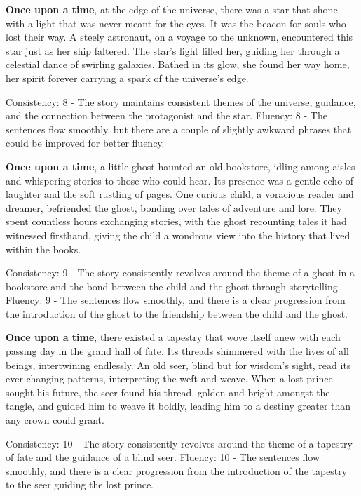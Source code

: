 \documentclass{article}
\begin{document}
\textbf{Once upon a time}, at the edge of the universe, there was a star that shone with a light that was never meant for the eyes. It was the beacon for souls who lost their way. A steely astronaut, on a voyage to the unknown, encountered this star just as her ship faltered. The star's light filled her, guiding her through a celestial dance of swirling galaxies. Bathed in its glow, she found her way home, her spirit forever carrying a spark of the universe's edge.

Consistency: 8 - The story maintains consistent themes of the universe, guidance, and the connection between the protagonist and the star.
Fluency: 8 - The sentences flow smoothly, but there are a couple of slightly awkward phrases that could be improved for better fluency.

\textbf{Once upon a time}, a little ghost haunted an old bookstore, idling among aisles and whispering stories to those who could hear. Its presence was a gentle echo of laughter and the soft rustling of pages. One curious child, a voracious reader and dreamer, befriended the ghost, bonding over tales of adventure and lore. They spent countless hours exchanging stories, with the ghost recounting tales it had witnessed firsthand, giving the child a wondrous view into the history that lived within the books.

Consistency: 9 - The story consistently revolves around the theme of a ghost in a bookstore and the bond between the child and the ghost through storytelling.
Fluency: 9 - The sentences flow smoothly, and there is a clear progression from the introduction of the ghost to the friendship between the child and the ghost.

\textbf{Once upon a time}, there existed a tapestry that wove itself anew with each passing day in the grand hall of fate. Its threads shimmered with the lives of all beings, intertwining endlessly. An old seer, blind but for wisdom’s sight, read its ever-changing patterns, interpreting the weft and weave. When a lost prince sought his future, the seer found his thread, golden and bright amongst the tangle, and guided him to weave it boldly, leading him to a destiny greater than any crown could grant.

Consistency: 10 - The story consistently revolves around the theme of a tapestry of fate and the guidance of a blind seer.
Fluency: 10 - The sentences flow smoothly, and there is a clear progression from the introduction of the tapestry to the seer guiding the lost prince.
\end{document}
